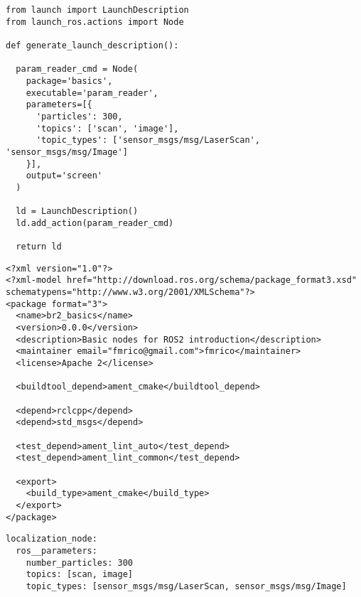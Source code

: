  \footnotesize
\begin{tcolorbox}[sharp corners, colframe=gray!80, colback=LightGray, left=0pt, top=0pt, bottom=0pt, title=\texttt{br2\_basics/launch/param\_node\_v1\_launch.py}]
  \begin{verbatim}
from launch import LaunchDescription
from launch_ros.actions import Node

def generate_launch_description():

  param_reader_cmd = Node(
    package='basics',
    executable='param_reader',
    parameters=[{
      'particles': 300,
      'topics': ['scan', 'image'],
      'topic_types': ['sensor_msgs/msg/LaserScan', 'sensor_msgs/msg/Image']
    }],
    output='screen'
  )

  ld = LaunchDescription()
  ld.add_action(param_reader_cmd)

  return ld
    \end{verbatim}
    \end{tcolorbox}
  \normalsize

 \footnotesize
\begin{tcolorbox}[sharp corners, colframe=gray!80, colback=LightGray, left=0pt, top=0pt, bottom=0pt, title=\texttt{br2\_basics/package.xml}]
  \begin{verbatim}
<?xml version="1.0"?>
<?xml-model href="http://download.ros.org/schema/package_format3.xsd" schematypens="http://www.w3.org/2001/XMLSchema"?>
<package format="3">
  <name>br2_basics</name>
  <version>0.0.0</version>
  <description>Basic nodes for ROS2 introduction</description>
  <maintainer email="fmrico@gmail.com">fmrico</maintainer>
  <license>Apache 2</license>

  <buildtool_depend>ament_cmake</buildtool_depend>

  <depend>rclcpp</depend>
  <depend>std_msgs</depend>

  <test_depend>ament_lint_auto</test_depend>
  <test_depend>ament_lint_common</test_depend>

  <export>
    <build_type>ament_cmake</build_type>
  </export>
</package>    \end{verbatim}
    \end{tcolorbox}
  \normalsize

 \footnotesize
\begin{tcolorbox}[sharp corners, colframe=gray!80, colback=LightGray, left=0pt, top=0pt, bottom=0pt, title=\texttt{br2\_basics/config/params.yaml}]
  \begin{verbatim}
localization_node:
  ros__parameters:
    number_particles: 300
    topics: [scan, image]
    topic_types: [sensor_msgs/msg/LaserScan, sensor_msgs/msg/Image]
    \end{verbatim}
    \end{tcolorbox}
  \normalsize


